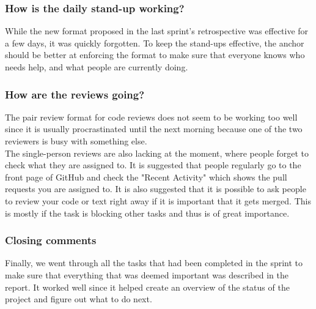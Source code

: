\subsubsection*{How is the daily stand-up working?}
While the new format proposed in the last sprint's retrospective was effective for a few days, it was quickly forgotten.
To keep the stand-ups effective, the anchor should be better at enforcing the format to make sure that everyone knows who needs help, and what people are currently doing.

\subsubsection*{How are the reviews going?}
The pair review format for code reviews does not seem to be working too well since it is usually procrastinated until the next morning because one of the two reviewers is busy with something else.
\\
The single-person reviews are also lacking at the moment, where people forget to check what they are assigned to.
It is suggested that people regularly go to the front page of GitHub and check the "Recent Activity" which shows the pull requests you are assigned to.
It is also suggested that it is possible to ask people to review your code or text right away if it is important that it gets merged.
This is mostly if the task is blocking other tasks and thus is of great importance.


\subsubsection*{Closing comments}
Finally, we went through all the tasks that had been completed in the sprint to make sure that everything that was deemed important was described in the report.
It worked well since it helped create an overview of the status of the project and figure out what to do next.